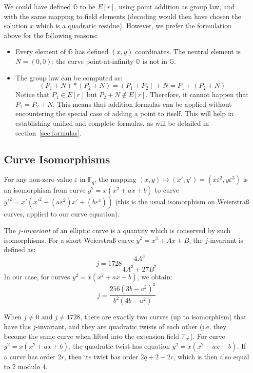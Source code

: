 \documentclass{llncs}
\newcommand{\bF}{\mathbb{F}}
\newcommand{\bG}{\mathbb{G}}
\newcommand{\neutral}{\mathbb{O}}
\begin{document}
We could have defined $\bG$ to be $E[r]$, using point addition as group
law, and with the same mapping to field elements (decoding would then have
chosen the solution $x$ which is a quadratic residue). However, we
prefer the formulation above for the following reasons:
\begin{itemize}

    \item Every element of $\bG$ has defined $(x,y)$ coordinates. The
    neutral element is $N = (0,0)$; the curve point-at-infinity $\neutral$
    is not in $\bG$.

    \item The group law can be computed as:
    \begin{equation*}
        (P_1 + N) * (P_2 + N) = (P_1 + P_2) + N = P_1 + (P_2 + N)
    \end{equation*}
    Notice that $P_1 \in E[r]$ but $P_2 + N \notin E[r]$. Therefore, it
    cannot happen that $P_1 = P_2 + N$. This means that addition
    formulas can be applied without encountering the special case of
    adding a point to itself. This will help in establishing unified and
    complete formulas, as will be detailed in section~\ref{sec:formulas}.

\end{itemize}

\subsection{Curve Isomorphisms}\label{sec:structure:isomorphism}

For any non-zero value $\varepsilon$ in $\bF_q$, the mapping
$(x,y) \mapsto (x',y') = (x\varepsilon^2, y\varepsilon^3)$ is an isomorphism
from curve $y^2 = x(x^2+ax+b)$ to curve
$y'^2 = x'(x'^2 + (a\varepsilon^2)x' + (b\varepsilon^4))$ (this is the usual
isomorphism on Weierstraß curves, applied to our curve equation).

The \emph{$j$-invariant} of an elliptic curve is a quantity which is
conserved by such isomorphisms. For a short Weierstraß curve
$y^2 = x^3 + Ax + B$, the $j$-invariant is defined as:
    $$ j = 1728 \frac{4A^3}{4A^3 + 27B^2} $$
In our case, for curves $y^2 = x(x^2 + ax + b)$, we obtain:
    $$ j = \frac{256 (3b - a^2)^3}{b^2(4b - a^2)} $$

When $j \neq 0$ and $j\neq 1728$, there are exactly two curves (up to
isomorphism) that have this $j$-invariant, and they are quadratic twists
of each other (i.e. they become the same curve when lifted into the
extension field $\bF_{q^2}$). For curve $y^2 = x(x^2 + ax + b)$, the
quadratic twist has equation $y^2 = x(x^2 - ax + b)$. If a curve has
order $2r$, then its twist has order $2q + 2 - 2r$, which is then also
equal to $2$ modulo $4$.
\end{document}
